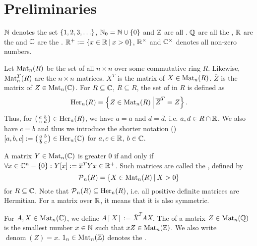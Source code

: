 

\section{Preliminaries}
\label{chapter:prelim}

$\mathbb{N}$ denotes the set $\Set{1,2,3,\dots}$, $\N_0 = \N \cup \Set{0}$ and $\mathbb{Z}$ are all . $\mathbb{Q}$ are all the , $\mathbb{R}$ are the  and $\mathbb{C}$ are the . $\R^+ := \Set{x\in\R}{x>0}$, $\mathbb{R}^\times$ and $\mathbb{C}^\times$ denotes all non-zero numbers.

Let $\operatorname{Mat}_n(R)$ be the set of all $n \times n$  over some commutative ring $R$.
Likewise, $\operatorname{Mat}_n^T(R)$ are the  $n \times n$ matrices.
$X^T$ is the  matrix of $X \in \operatorname{Mat}_n(R)$.
$\overline{Z}$ is the  matrix of $Z \in \operatorname{Mat}_n(\mathbb{C})$.
For $R \subseteq \mathbb{C}$, $\overline{R} \subseteq R$, the set of  in $R$ is defined as
\[ \Her_n(R) = \Set{Z \in \M_n(R)}{\overline{Z}^T = Z} . \]
Thus, for $\left( \begin{smallmatrix} a & b \\ c & d \end{smallmatrix} \right) \in \operatorname{Her}_n(R)$, we have $a = \overline{a}$ and $d = \overline{d}$, i.e. $a,d \in R \cap \mathbb{R}$. We also have $c = \overline{b}$ and thus we introduce the shorter notation () $[a,b,c] := \left( \begin{smallmatrix} a & b \\ \overline{b} & c \end{smallmatrix} \right) \in \operatorname{Her}_n(\mathbb{C})$ for $a,c \in \mathbb{R}$, $b \in \mathbb{C}$.

A matrix $Y \in \operatorname{Mat}_n(\mathbb{C})$ is greater $0$ if and only if $\forall x \in \C^n - \Set{0} \colon Y[x] := \overline{x}^{T} Y x \in \R^+$.
Such matrices are called the , defined by
\[ \PM_n(R) = \Set{X \in \M_n(R)}{X > 0} \]
for $R \subseteq \mathbb{C}$. Note that $\operatorname{\mathcal{P}}_n(R) \subseteq \operatorname{Her}_n(R)$, i.e. all positive definite matrices are Hermitian. For a matrix over $\mathbb{R}$, it means that it is also symmetric.

For $A,X \in \operatorname{Mat}_n(\mathbb{C})$, we define $A[X] := \overline{X}^T A X$. 
The  of a matrix $Z \in \operatorname{Mat}_n(\mathbb{Q})$ is the smallest number $x \in \mathbb{N}$ such that $x Z \in \operatorname{Mat}_n(\mathbb{Z})$. We also write $\operatorname{denom}(Z) = x$. $1_n \in \operatorname{Mat}_n(\mathbb{Z})$ denotes the .

